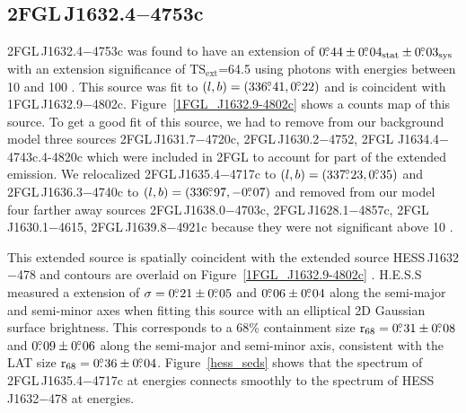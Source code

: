 \documentclass[12pt,preprint]{aastex}
\newcommand{\gev}{\text{GeV}\xspace}
\newcommand{\tev}{\text{TeV}\xspace}
\newcommand{\tsext}{{\ensuremath{\text{TS}_{\text{ext}}}}\xspace}
\newcommand{\rsixeight}{{\ensuremath{\text{r}_{68}}}\xspace}
\newcommand{\sys}{\text{sys}\xspace}
\newcommand{\stat}{\text{stat}\xspace}
\begin{document}
\subsection{2FGL\,J1632.4$-$4753c}
\label{section_2FGL_J1632.4-4753c}



2FGL\,J1632.4$-$4753c was found 
to
have an extension of $0\fdg44\pm0\fdg04_\stat\pm0\fdg03_\sys$ 
with an extension
significance of \tsext=64.5
using 
photons with energies between
10 \gev and 100 \gev.  This source was fit to 
$(l,b)=(336\mbox{$.\!\!^\circ$}41,0\mbox{$.\!\!^\circ$}22)$ and is coincident with 
1FGL\,J1632.9$-$4802c.  Figure~\ref{1FGL_J1632.9-4802c}
shows a counts map of this source.
To get a good fit of this source, we had to remove from our background model
three sources 2FGL\,J1631.7$-$4720c, 2FGL\,J1630.2$-$4752,
2FGL J1634.4$-$4743c.4-4820c which were included in 2FGL to account for
part of the extended emission.
We relocalized 2FGL\,J1635.4$-$4717c
to $(l,b)=(337\mbox{$.\!\!^\circ$}23,0\mbox{$.\!\!^\circ$}35)$ and 2FGL\,J1636.3$-$4740c to
$(l,b)=(336\mbox{$.\!\!^\circ$}97,-0\mbox{$.\!\!^\circ$}07)$
and removed from our model four
farther away sources 2FGL\,J1638.0$-$4703c, 
2FGL\,J1628.1$-$4857c, 2FGL\,J1630.1$-$4615, 2FGL\,J1639.8$-$4921c because they
were not significant above 10 \gev.  

This extended source is spatially coincident with the extended
\tev source HESS\,J1632$-$478 
and \tev contours are overlaid on 
Figure~\ref{1FGL_J1632.9-4802c}
\citep{hess_plane_survey}.
H.E.S.S measured a 
extension of $\sigma=0\mbox{$.\!\!^\circ$}21\pm0\mbox{$.\!\!^\circ$}05$ and $0\mbox{$.\!\!^\circ$}06\pm0\mbox{$.\!\!^\circ$}04$ along the
semi-major and semi-minor axes when fitting this source with an
elliptical 2D Gaussian surface brightness.  This corresponds to a 68\%
containment size $\rsixeight=0\fdg31\pm0\fdg08$ and $0\mbox{$.\!\!^\circ$}09\pm0\mbox{$.\!\!^\circ$}06$
along the semi-major and semi-minor axis, consistent with
the LAT size $\rsixeight=0\fdg36\pm0\fdg04$.  Figure~\ref{hess_seds}
shows that the spectrum of 2FGL\,J1635.4$-$4717c at \gev energies
connects smoothly to
the spectrum of HESS\,J1632$-$478 at \tev energies.
\end{document}
